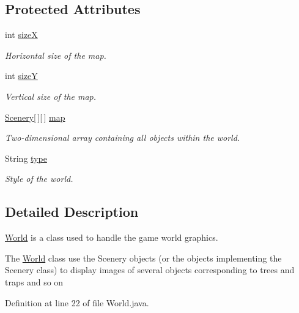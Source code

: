 \subsection*{Protected Attributes}
\begin{DoxyCompactItemize}
\item 
int \hyperlink{classworld_1_1_world_ab2ca92c9d2a56f6fa1872dc6cf0f4ab3}{size\-X}
\begin{DoxyCompactList}\small\item\em Horizontal size of the map. \end{DoxyCompactList}\item 
int \hyperlink{classworld_1_1_world_a3a110ad1276dc7dfa6bc47d9a663ec5e}{size\-Y}
\begin{DoxyCompactList}\small\item\em Vertical size of the map. \end{DoxyCompactList}\item 
\hyperlink{classworld_1_1scenery_1_1_scenery}{Scenery}\mbox{[}$\,$\mbox{]}\mbox{[}$\,$\mbox{]} \hyperlink{classworld_1_1_world_ab586ab2ff7a28c66e492722dd30a2d5a}{map}
\begin{DoxyCompactList}\small\item\em Two-\/dimensional array containing all objects within the world. \end{DoxyCompactList}\item 
String \hyperlink{classworld_1_1_world_a008564127f7e69c09224a84ca7081893}{type}
\begin{DoxyCompactList}\small\item\em Style of the world. \end{DoxyCompactList}\end{DoxyCompactItemize}


\subsection{Detailed Description}
\hyperlink{classworld_1_1_world}{World} is a class used to handle the game world graphics. 

The \hyperlink{classworld_1_1_world}{World} class use the Scenery objects (or the objects implementing the Scenery class) to display images of several objects corresponding to trees and traps and so on 

Definition at line 22 of file World.\-java.



